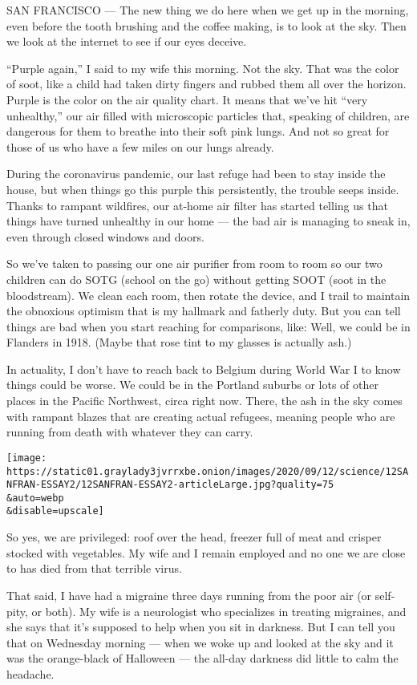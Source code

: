 SAN FRANCISCO --- The new thing we do here when we get up in the
morning, even before the tooth brushing and the coffee making, is to
look at the sky. Then we look at the internet to see if our eyes
deceive.

``Purple again,'' I said to my wife this morning. Not the sky. That was
the color of soot, like a child had taken dirty fingers and rubbed them
all over the horizon. Purple is the color on the air quality chart. It
means that we've hit ``very unhealthy,'' our air filled with microscopic
particles that, speaking of children, are dangerous for them to breathe
into their soft pink lungs. And not so great for those of us who have a
few miles on our lungs already.

During the coronavirus pandemic, our last refuge had been to stay inside
the house, but when things go this purple this persistently, the trouble
seeps inside. Thanks to rampant wildfires, our at-home air filter has
started telling us that things have turned unhealthy in our home --- the
bad air is managing to sneak in, even through closed windows and doors.

So we've taken to passing our one air purifier from room to room so our
two children can do SOTG (school on the go) without getting SOOT (soot
in the bloodstream). We clean each room, then rotate the device, and I
trail to maintain the obnoxious optimism that is my hallmark and
fatherly duty. But you can tell things are bad when you start reaching
for comparisons, like: Well, we could be in Flanders in 1918. (Maybe
that rose tint to my glasses is actually ash.)

In actuality, I don't have to reach back to Belgium during World War I
to know things could be worse. We could be in the Portland suburbs or
lots of other places in the Pacific Northwest, circa right now. There,
the ash in the sky comes with rampant blazes that are creating actual
refugees, meaning people who are running from death with whatever they
can carry.

\texttt{[image: https://static01.graylady3jvrrxbe.onion/images/2020/09/12/science/12SANFRAN-ESSAY2/12SANFRAN-ESSAY2-articleLarge.jpg?quality=75\\\&auto=webp\\\&disable=upscale]}

So yes, we are privileged: roof over the head, freezer full of meat and
crisper stocked with vegetables. My wife and I remain employed and no
one we are close to has died from that terrible virus.

That said, I have had a migraine three days running from the poor air
(or self-pity, or both). My wife is a neurologist who specializes in
treating migraines, and she says that it's supposed to help when you sit
in darkness. But I can tell you that on Wednesday morning --- when we
woke up and looked at the sky and it was the orange-black of Halloween
--- the all-day darkness did little to calm the headache.


